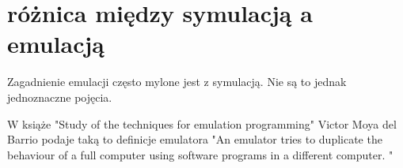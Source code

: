	\section{różnica między symulacją a emulacją} 
	Zagadnienie emulacji często mylone jest z symulacją. Nie są to jednak jednoznaczne pojęcia.
	
	W książe "Study of the techniques for emulation
	programming" Victor Moya del Barrio podaje taką to definicje emulatora "An emulator tries to duplicate the behaviour of a full computer using software programs in a different computer. "\cite{studyofthetechniquesforemulationprogramming}